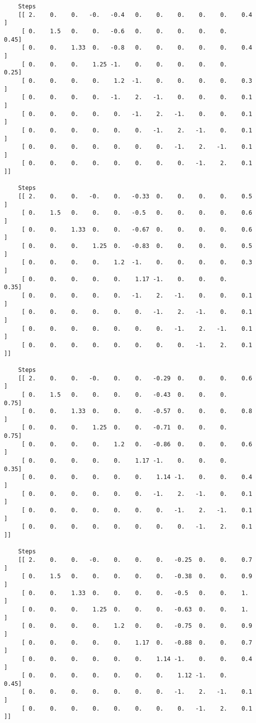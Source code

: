\documentclass{article}
\begin{document}
\begin{lstlisting}
    Steps
    [[ 2.    0.    0.   -0.   -0.4   0.    0.    0.    0.    0.    0.4 ]
     [ 0.    1.5   0.    0.   -0.6   0.    0.    0.    0.    0.    0.45]
     [ 0.    0.    1.33  0.   -0.8   0.    0.    0.    0.    0.    0.4 ]
     [ 0.    0.    0.    1.25 -1.    0.    0.    0.    0.    0.    0.25]
     [ 0.    0.    0.    0.    1.2  -1.    0.    0.    0.    0.    0.3 ]
     [ 0.    0.    0.    0.   -1.    2.   -1.    0.    0.    0.    0.1 ]
     [ 0.    0.    0.    0.    0.   -1.    2.   -1.    0.    0.    0.1 ]
     [ 0.    0.    0.    0.    0.    0.   -1.    2.   -1.    0.    0.1 ]
     [ 0.    0.    0.    0.    0.    0.    0.   -1.    2.   -1.    0.1 ]
     [ 0.    0.    0.    0.    0.    0.    0.    0.   -1.    2.    0.1 ]]
     
    Steps
    [[ 2.    0.    0.   -0.    0.   -0.33  0.    0.    0.    0.    0.5 ]
     [ 0.    1.5   0.    0.    0.   -0.5   0.    0.    0.    0.    0.6 ]
     [ 0.    0.    1.33  0.    0.   -0.67  0.    0.    0.    0.    0.6 ]
     [ 0.    0.    0.    1.25  0.   -0.83  0.    0.    0.    0.    0.5 ]
     [ 0.    0.    0.    0.    1.2  -1.    0.    0.    0.    0.    0.3 ]
     [ 0.    0.    0.    0.    0.    1.17 -1.    0.    0.    0.    0.35]
     [ 0.    0.    0.    0.    0.   -1.    2.   -1.    0.    0.    0.1 ]
     [ 0.    0.    0.    0.    0.    0.   -1.    2.   -1.    0.    0.1 ]
     [ 0.    0.    0.    0.    0.    0.    0.   -1.    2.   -1.    0.1 ]
     [ 0.    0.    0.    0.    0.    0.    0.    0.   -1.    2.    0.1 ]]
     
    Steps
    [[ 2.    0.    0.   -0.    0.    0.   -0.29  0.    0.    0.    0.6 ]
     [ 0.    1.5   0.    0.    0.    0.   -0.43  0.    0.    0.    0.75]
     [ 0.    0.    1.33  0.    0.    0.   -0.57  0.    0.    0.    0.8 ]
     [ 0.    0.    0.    1.25  0.    0.   -0.71  0.    0.    0.    0.75]
     [ 0.    0.    0.    0.    1.2   0.   -0.86  0.    0.    0.    0.6 ]
     [ 0.    0.    0.    0.    0.    1.17 -1.    0.    0.    0.    0.35]
     [ 0.    0.    0.    0.    0.    0.    1.14 -1.    0.    0.    0.4 ]
     [ 0.    0.    0.    0.    0.    0.   -1.    2.   -1.    0.    0.1 ]
     [ 0.    0.    0.    0.    0.    0.    0.   -1.    2.   -1.    0.1 ]
     [ 0.    0.    0.    0.    0.    0.    0.    0.   -1.    2.    0.1 ]]
     
    Steps
    [[ 2.    0.    0.   -0.    0.    0.    0.   -0.25  0.    0.    0.7 ]
     [ 0.    1.5   0.    0.    0.    0.    0.   -0.38  0.    0.    0.9 ]
     [ 0.    0.    1.33  0.    0.    0.    0.   -0.5   0.    0.    1.  ]
     [ 0.    0.    0.    1.25  0.    0.    0.   -0.63  0.    0.    1.  ]
     [ 0.    0.    0.    0.    1.2   0.    0.   -0.75  0.    0.    0.9 ]
     [ 0.    0.    0.    0.    0.    1.17  0.   -0.88  0.    0.    0.7 ]
     [ 0.    0.    0.    0.    0.    0.    1.14 -1.    0.    0.    0.4 ]
     [ 0.    0.    0.    0.    0.    0.    0.    1.12 -1.    0.    0.45]
     [ 0.    0.    0.    0.    0.    0.    0.   -1.    2.   -1.    0.1 ]
     [ 0.    0.    0.    0.    0.    0.    0.    0.   -1.    2.    0.1 ]]
     

\end{lstlisting}
\end{document}
